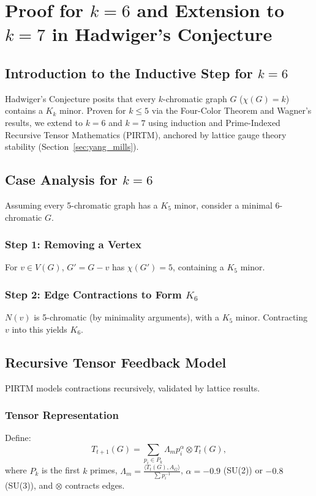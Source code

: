 \documentclass{article}
\theoremstyle{plain}
\begin{document}
\section{Proof for \( k = 6 \) and Extension to \( k = 7 \) in Hadwiger’s Conjecture}
\label{sec:hadwiger}

\subsection{Introduction to the Inductive Step for \( k = 6 \)}
Hadwiger’s Conjecture posits that every \( k \)-chromatic graph \( G \) (\( \chi(G) = k \)) contains a \( K_k \) minor. Proven for \( k \leq 5 \) via the Four-Color Theorem and Wagner’s results, we extend to \( k = 6 \) and \( k = 7 \) using induction and Prime-Indexed Recursive Tensor Mathematics (PIRTM), anchored by lattice gauge theory stability (Section~\ref{sec:yang_mills}).

\subsection{Case Analysis for \( k = 6 \)}
Assuming every 5-chromatic graph has a \( K_5 \) minor, consider a minimal 6-chromatic \( G \).

\subsubsection{Step 1: Removing a Vertex}
For \( v \in V(G) \), \( G' = G - v \) has \( \chi(G') = 5 \), containing a \( K_5 \) minor.

\subsubsection{Step 2: Edge Contractions to Form \( K_6 \)}
\( N(v) \) is 5-chromatic (by minimality arguments), with a \( K_5 \) minor. Contracting \( v \) into this yields \( K_6 \).

\subsection{Recursive Tensor Feedback Model}
PIRTM models contractions recursively, validated by lattice results.

\subsubsection{Tensor Representation}
Define:
\begin{equation}
T_{t+1}(G) = \sum_{p_i \in P_k} \Lambda_m p_i^\alpha \otimes T_t(G),
\end{equation}
where \( P_k \) is the first \( k \) primes, \( \Lambda_m = \frac{\langle T_t(G), A_G \rangle}{\sum p_i^{-1}} \), \( \alpha = -0.9 \) (SU(2)) or \(-0.8\) (SU(3)), and \( \otimes \) contracts edges.
\end{document}
